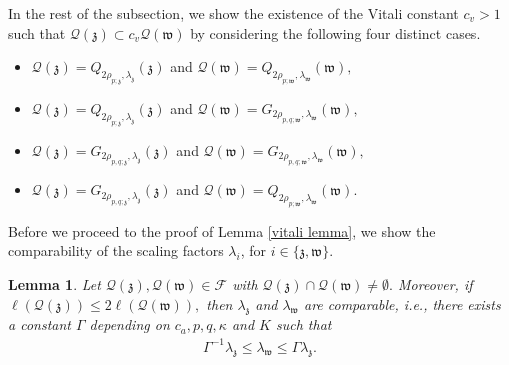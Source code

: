 \documentclass[notitlepage,11pt,reqno]{amsart}
\newtheorem{lemma}[theorem]{Lemma}
\theoremstyle{definition}
\numberwithin{equation}{section}
\begin{document}
In the rest of the subsection, we show the existence of the Vitali constant $c_v>1$ such that $\mathcal{Q}(\mathfrak{z}) \subset c_v \mathcal{Q}(\mathfrak{w})$ by considering the following four distinct cases.
\begin{itemize}
    \item [(i)] $\mathcal{Q}(\mathfrak z)=Q_{2\rho_{p; \mathfrak z}, \lambda_{\mathfrak z}}(\mathfrak z)$ and $\mathcal{Q}(\mathfrak w)=Q_{2\rho_{p; \mathfrak w}, \lambda_\mathfrak w}(\mathfrak w),$
    \item [(ii)] $\mathcal{Q}(\mathfrak z)=Q_{2\rho_{p; \mathfrak z}, \lambda_{\mathfrak z}}(\mathfrak z)$ and $\mathcal{Q}(\mathfrak w)=G_{2\rho_{p,q; \mathfrak w}, \lambda_\mathfrak w}(\mathfrak w),$
    \item [(iii)] $\mathcal{Q}(\mathfrak z)=G_{2\rho_{p,q; \mathfrak z}, \lambda_{\mathfrak z}}(\mathfrak z)$ and $\mathcal{Q}(\mathfrak w)=G_{2\rho_{p,q; \mathfrak w}, \lambda_\mathfrak w}(\mathfrak w),$
    \item [(iv)] $\mathcal{Q}(\mathfrak z)=G_{2\rho_{p,q; \mathfrak z}, \lambda_{\mathfrak z}}(\mathfrak z)$ and $\mathcal{Q}(\mathfrak w)=Q_{2\rho_{p; \mathfrak w}, \lambda_\mathfrak w}(\mathfrak w).$
\end{itemize}
Before we proceed to the proof of Lemma \ref{vitali lemma}, we show the comparability of the scaling factors $\lambda_{i}$, for $i \in \{\mathfrak z, \mathfrak w\}$.
\begin{lemma}
Let $\mathcal{Q}(\mathfrak z), \mathcal{Q}(\mathfrak w)\in \mathcal{F}$ with $\mathcal{Q}(\mathfrak z)\cap \mathcal{Q}(\mathfrak w)\neq \emptyset.$ Moreover, if $\ell(\mathcal{Q}(\mathfrak z))\leq 2 \ell(\mathcal{Q}(\mathfrak w)),$ then $\lambda_{\mathfrak z}$ and $\lambda_{\mathfrak w}$ are comparable, i.e., there exists a constant $\Gamma$ depending on $c_a, p, q, \kappa$ and $K$ such that
\begin{align*}
    \Gamma^{-1}\lambda_{\mathfrak z} \leq \lambda_{\mathfrak w}\leq \Gamma \lambda_{\mathfrak z}.
\end{align*}
\end{lemma}
\end{document}
